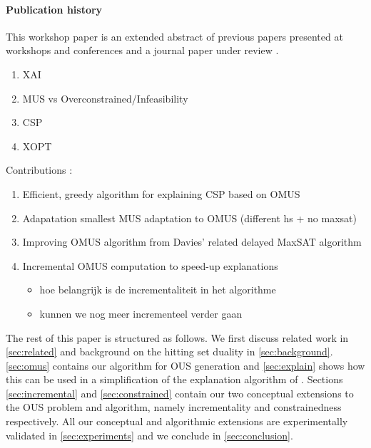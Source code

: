 {{\paragraph*{Publication history} This workshop paper is an extended abstract of previous papers presented at workshops and conferences \cite{claesuser,DBLP:conf/bnaic/ClaesBCGG19,ecai/BogaertsGCG20} and a journal paper under review \cite{bogaerts2020framework}.
}

\begin{enumerate}
    \item XAI
    \item MUS vs Overconstrained/Infeasibility
    \item CSP
    \item XOPT
\end{enumerate}

Contributions : 
\begin{enumerate}
    \item Efficient, greedy algorithm for explaining CSP based on OMUS 
    \item Adapatation smallest MUS adaptation to OMUS (different hs + no maxsat) 
    \item Improving OMUS algorithm from Davies' related delayed MaxSAT algorithm 
    \item Incremental OMUS computation to speed-up explanations
    \begin{itemize}
        \item hoe belangrijk is de incrementaliteit in het algorithme
        \item kunnen  we nog meer incrementeel verder gaan
    \end{itemize}
\end{enumerate}
}


The rest of this paper is structured as follows. We first discuss related work in \cref{sec:related} and background on the hitting set duality in \cref{sec:background}. \cref{sec:omus} contains our algorithm for OUS generation and \cref{sec:explain} shows how this can be used in a simplification of the explanation algorithm of \citet{ecai/BogaertsGCG20}. 
Sections \ref{sec:incremental} and \ref{sec:constrained} contain our two conceptual extensions to the OUS problem and algorithm, namely incrementality and constrainedness respectively. 
All our conceptual and algorithmic extensions are experimentally validated in \cref{sec:experiments} and we conclude in \cref{sec:conclusion}.


